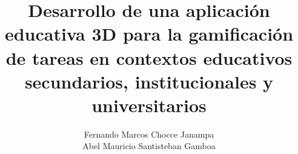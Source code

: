 \documentclass[stu,12pt,letterpaper,donotrepeattitle,floatsintext,natbib]{apa7}
\title{\Large Desarrollo de una aplicación educativa 3D para la gamificación de tareas en contextos educativos secundarios, institucionales y universitarios}
\author{Fernando Marcos Chocce Janampa \\ Abel Mauricio Santisteban Gamboa}
\begin{document}
\maketitle

\renewcommand\contentsname{\largeÍndice}
\tableofcontents
\setcounter{tocdepth}{2}
\newpage
\renewcommand{\listfigurename}{\largeÍndice de fíguras}
\listoffigures
\newpage
\renewcommand{\listtablename}{\largeÍndice de tablas}
\listoftables
\newpage
{}









\renewcommand\refname{\large\textbf{Referencias}}

\end{document}

